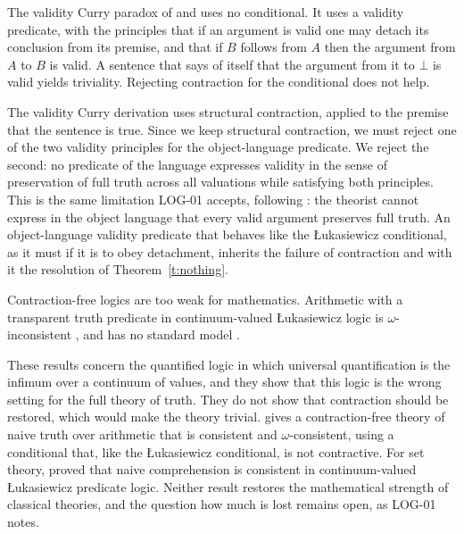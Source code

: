 \documentclass{situationist-preprint}
\begin{document}
\begin{objection}
The validity Curry paradox of \citet{BeallMurzi2013} and \citet{Shapiro2011} uses no conditional. It uses a validity predicate, with the principles that if an argument is valid one may detach its conclusion from its premise, and that if $B$ follows from $A$ then the argument from $A$ to $B$ is valid. A sentence that says of itself that the argument from it to $\bot$ is valid yields triviality. Rejecting contraction for the conditional does not help.
\end{objection}

\begin{reply}
The validity Curry derivation uses structural contraction, applied to the premise that the sentence is true. Since we keep structural contraction, we must reject one of the two validity principles for the object-language predicate. We reject the second: no predicate of the language expresses validity in the sense of preservation of full truth across all valuations while satisfying both principles. This is the same limitation LOG-01 accepts, following \citet{MurziRossi2020}: the theorist cannot express in the object language that every valid argument preserves full truth. An object-language validity predicate that behaves like the Łukasiewicz conditional, as it must if it is to obey detachment, inherits the failure of contraction and with it the resolution of Theorem~\ref{t:nothing}.
\end{reply}

\begin{objection}
Contraction-free logics are too weak for mathematics. Arithmetic with a transparent truth predicate in continuum-valued Łukasiewicz logic is $\omega$-inconsistent \citep{Restall1992}, and has no standard model \citep{HajekEtAl2000}.
\end{objection}

\begin{reply}
These results concern the quantified logic in which universal quantification is the infimum over a continuum of values, and they show that this logic is the wrong setting for the full theory of truth. They do not show that contraction should be restored, which would make the theory trivial. \citet{Field2008} gives a contraction-free theory of naive truth over arithmetic that is consistent and $\omega$-consistent, using a conditional that, like the Łukasiewicz conditional, is not contractive. For set theory, \citet{White1979} proved that naive comprehension is consistent in continuum-valued Łukasiewicz predicate logic. Neither result restores the mathematical strength of classical theories, and the question how much is lost remains open, as LOG-01 notes.
\end{reply}
\end{document}
